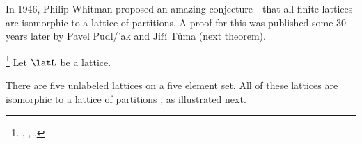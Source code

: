 {In 1946, Philip Whitman proposed an amazing conjecture---that all finite lattices are isomorphic to a lattice of partitions.
A proof for this was published some 30 years later by
Pavel Pudl{/'a}k and Ji\v{r}\'i T\r{u}ma (next theorem).
\begin{theorem}
\footnote{
  ,
  ,
  ,
  }
\label{thm:latpart}
Let $\latL$ be a lattice.
\end{theorem}

\begin{example}
\label{ex:ss_lat5part}
There are five unlabeled lattices on a five element 
set.
All of these lattices are isomorphic to a lattice of partitions ,
as illustrated next.
\\
\end{example}

} %

